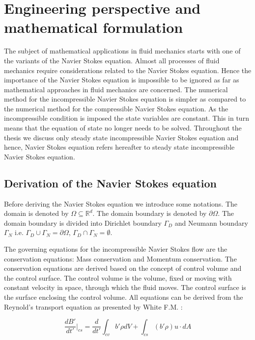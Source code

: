 \documentclass[a4paper,openany]{book}
\begin{document}
\newpage

\chapter[Perspective and formulation]{Engineering perspective and mathematical formulation} 

The subject of mathematical applications in fluid mechanics starts with  one of the variants of the Navier Stokes equation. Almost all processes of fluid mechanics require considerations related to the Navier Stokes equation. Hence the importance of the Navier Stokes equation is impossible to be ignored as far as mathematical approaches in fluid mechanics are concerned. The numerical method for the incompressible Navier Stokes equation is simpler as compared to the numerical method for the compressible Navier Stokes equation. As the incompressible condition is imposed the state variables are constant. This in turn means that the equation of state no longer needs to be solved. Throughout the thesis we discuss only steady state incompressible Navier Stokes equation and hence, Navier Stokes equation refers hereafter to steady state incompressible Navier Stokes equation.

\section[Derivation]{Derivation of the Navier Stokes equation}

Before deriving the Navier Stokes equation we introduce some notations. The domain is denoted by $\Omega \subseteq \mathbb{R}^d $. The domain boundary is denoted by $\partial \Omega$. The domain boundary is divided into Dirichlet boundary $\Gamma_D$ and Neumann boundary $\Gamma_N$ i.e. $\Gamma_D \cup \Gamma_N = \partial \Omega $, $\Gamma_D \cap \Gamma_N = \emptyset $. 

The governing equations for the incompressible Navier Stokes flow are the conservation equations: Mass conservation and Momentum conservation. The conservation equations are derived based on the concept of control volume and the control surface. The control volume is the volume, fixed or moving with constant velocity in space, through which the fluid moves. The control surface is the surface enclosing the control volume. All equations can be derived from the Reynold's transport equation as presented by White F.M. \cite{white}:


\begin{equation} \label{rtt} 
\frac{dB'}{dt'}|_{cs} = \frac{d}{dt'} \int_{cv} b' \rho dV + \int_{cs} (b' \rho) u\cdot dA 
\end{equation}
\end{document}
